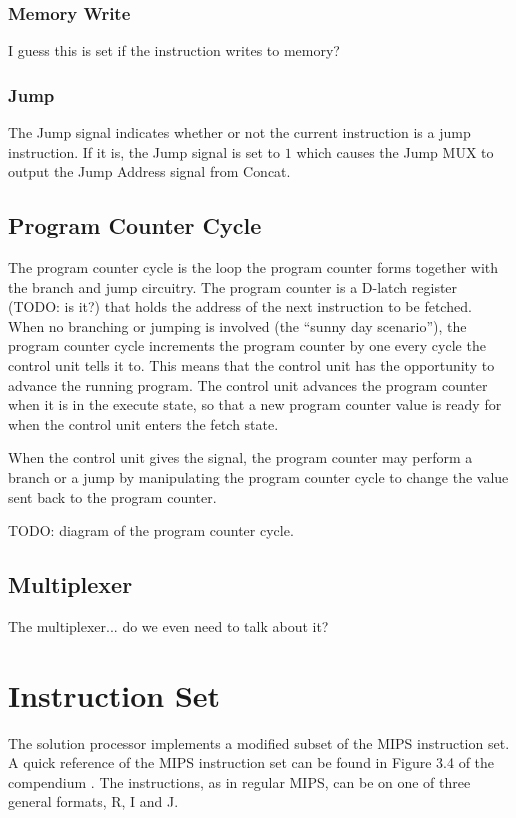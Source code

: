 \subsubsection{Memory Write}
I guess this is set if the instruction writes to memory?

\subsubsection{Jump}
The Jump signal indicates whether or not the current instruction is a jump instruction. If it is, the Jump signal is set to $1$ which causes the Jump MUX to output the Jump Address signal from Concat.

\subsection{Program Counter Cycle}

The program counter cycle is the loop the program counter forms together with the branch and jump circuitry.
The program counter is a D-latch register (TODO: is it?) that holds the address of the next instruction to be fetched.
When no branching or jumping is involved (the ``sunny day scenario''), the program counter cycle increments the program counter by one every cycle the control unit tells it to.
This means that the control unit has the opportunity to advance the running program.
The control unit advances the program counter when it is in the execute state, so that a new program counter value is ready for when the control unit enters the fetch state.

When the control unit gives the signal, the program counter may perform a branch or a jump by manipulating the program counter cycle to change the value sent back to the program counter.

TODO: diagram of the program counter cycle.

\subsection{Multiplexer}

The multiplexer... do we even need to talk about it?

\section{Instruction Set}

The solution processor implements a modified subset of the MIPS instruction set.
A quick reference of the MIPS instruction set can be found in Figure 3.4 of the compendium \cite{compendium}.
The instructions, as in regular MIPS, can be on one of three general formats, R, I and J.


